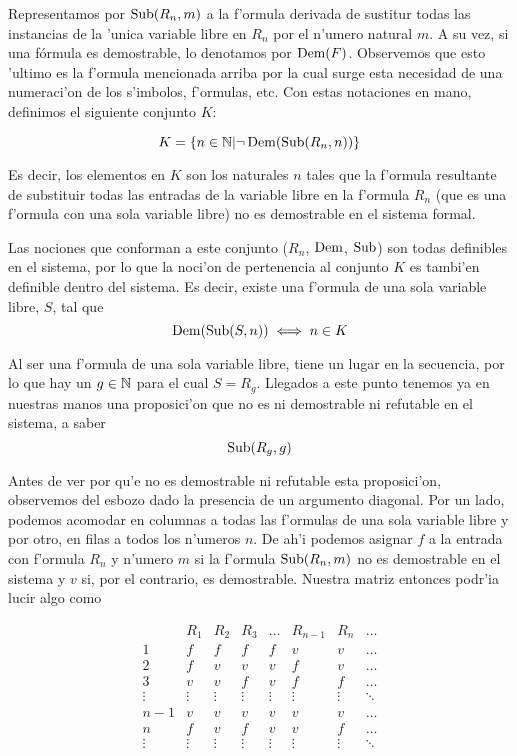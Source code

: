 Representamos por $\operatorname{Sub}(R_n, m)$ a la f'ormula derivada de sustitur todas las instancias de la 'unica variable libre en $R_n$ por el n'umero natural $m$. A su vez, si una fórmula es demostrable, lo denotamos por $\operatorname{Dem} (F)$. Observemos que esto 'ultimo es la f'ormula mencionada arriba por la cual surge esta necesidad de una numeraci'on de los s'imbolos, f'ormulas, etc.  Con estas notaciones en mano, definimos el siguiente conjunto $K$: 

\[K = \{n\in \mathbb N \vert \lnot \operatorname{Dem}(\operatorname{Sub}(R_n,n))\}\]

Es decir, los elementos en $K$ son los naturales $n$ tales que la f'ormula resultante de substituir todas las entradas de la variable libre en la f'ormula $R_n$ (que es una f'ormula con una sola variable libre) no es demostrable en el sistema formal. 

Las nociones que conforman a este conjunto ($R_n$, $\operatorname{Dem}$, $\operatorname{Sub}$) son todas definibles en el sistema, por lo que la noci'on de pertenencia al conjunto $K$ es tambi'en definible dentro del sistema. Es decir, existe una f'ormula  de una sola variable libre, $S$, tal que 
\[\operatorname{Dem}(\operatorname{Sub}(S,n))\iff n\in K\]

Al ser una f'ormula de una sola variable libre, tiene un lugar en la secuencia, por lo que hay un $g\in \mathbb N$ para el cual $S=R_g$. Llegados a este punto tenemos ya en nuestras manos una proposici'on que no es ni demostrable ni refutable en el sistema, a saber 
\[\operatorname{Sub}(R_g,g)\]

Antes de ver por qu'e no es demostrable ni refutable esta proposici'on, observemos del esbozo dado la presencia de un argumento diagonal. Por un lado, podemos acomodar en columnas a todas las f'ormulas de una sola variable libre y por otro, en filas a todos los n'umeros $n$. De ah'i podemos asignar $f$ a la entrada con f'ormula $R_n$ y n'umero $m$ si la f'ormula $\operatorname{Sub}(R_n, m)$ no es demostrable en el sistema y $v$ si, por el contrario, es demostrable. Nuestra matriz entonces podr'ia lucir algo como 

\[
\begin{matrix}
    & R_1 & R_2 & R_3 & \dots & R_{n-1} & R_n & \dots\\
    1 &  f & f & f &f & v &v & \dots\\
    2 & f & v & v &v &  f & v & \dots\\
    3 &  v & v & f & v & f & f & \dots\\
    \vdots& \vdots & \vdots & \vdots & \vdots & \vdots & \vdots & \ddots \\
    n-1& v & v & v & v &v & v & \dots\\
    n& f & v & f & v & v & f & \dots\\
    \vdots & \vdots & \vdots & \vdots & \vdots & \vdots & \vdots & \ddots\\
\end{matrix}\]

